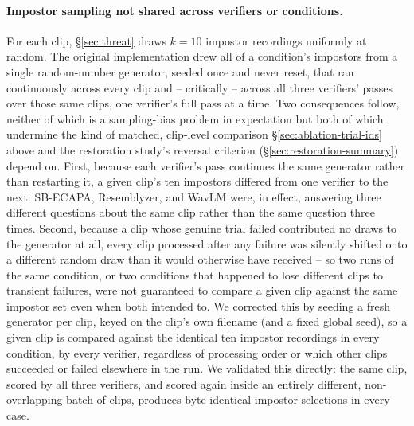 \documentclass[11pt]{article}
\begin{document}
\paragraph{Impostor sampling not shared across verifiers or
conditions.} For each clip, \S\ref{sec:threat} draws $k=10$ impostor
recordings uniformly at random. The original implementation drew all
of a condition's impostors from a single random-number generator,
seeded once and never reset, that ran continuously across every clip
and -- critically -- across all three verifiers' passes over those
same clips, one verifier's full pass at a time. Two consequences
follow, neither of which is a sampling-bias problem in expectation but
both of which undermine the kind of matched, clip-level comparison
\S\ref{sec:ablation-trial-ids} above and the restoration study's
reversal criterion (\S\ref{sec:restoration-summary}) depend on. First,
because each verifier's pass continues the same generator rather than
restarting it, a given clip's ten impostors differed from one verifier
to the next: SB-ECAPA, Resemblyzer, and WavLM were, in effect,
answering three different questions about the same clip rather than
the same question three times. Second, because a clip whose genuine
trial failed contributed no draws to the generator at all, every clip
processed after any failure was silently shifted onto a different
random draw than it would otherwise have received -- so two runs of
the same condition, or two conditions that happened to lose different
clips to transient failures, were not guaranteed to compare a given
clip against the same impostor set even when both intended to. We
corrected this by seeding a fresh generator per clip, keyed on the
clip's own filename (and a fixed global seed), so a given clip is
compared against the identical ten impostor recordings in every
condition, by every verifier, regardless of processing order or which
other clips succeeded or failed elsewhere in the run. We validated
this directly: the same clip, scored by all three verifiers, and
scored again inside an entirely different, non-overlapping batch of
clips, produces byte-identical impostor selections in every case.
\end{document}

